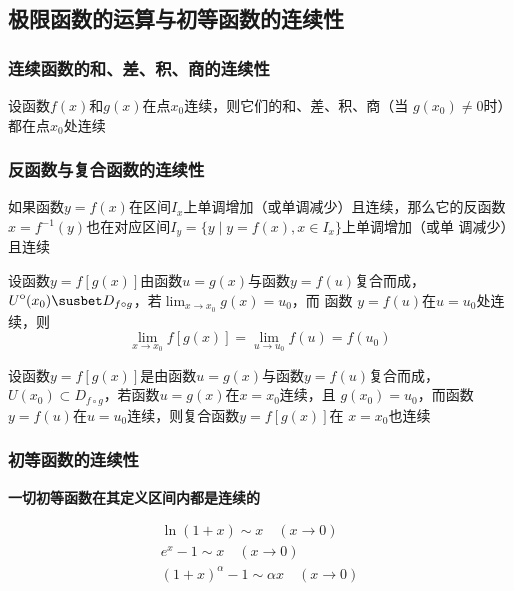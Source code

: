 \documentclass[11pt]{article}
\begin{document}
\subsection{极限函数的运算与初等函数的连续性}
\label{sec:orgcdb8aaa}
\subsubsection{连续函数的和、差、积、商的连续性}
\label{sec:orgd27b1d1}
\begin{theorem}[]
设函数\(f(x)\)和\(g(x)\)在点\(x_0\)连续，则它们的和、差、积、商（当
\(g(x_0)\neq0\)时）都在点\(x_0\)处连续
\end{theorem}
\subsubsection{反函数与复合函数的连续性}
\label{sec:org787c767}
\begin{theorem}[]
如果函数\(y=f(x)\)在区间\(I_x\)上单调增加（或单调减少）且连续，那么它的反函数
\(x=f^{-1}(y)\)也在对应区间\(I_y=\{y\mid y=f(x),x\in I_x\}\)上单调增加（或单
调减少）且连续
\end{theorem}

\begin{theorem}[]
设函数\(y=f[g(x)]\)由函数\(u=g(x)\)与函数\(y=f(u)\)复合而成，
\(\interior{U}(x_0)\susbet D_{f\circ g}\)，若\(\lim_{x\to x_0}g(x)=u_0\)，而
函数 \(y=f(u)\)在\(u=u_0\)处连续，则
\begin{equation*}
\lim_{x\to x_0}f[g(x)]=\lim_{u\to u_0}f(u)=f(u_0)
\end{equation*}
\end{theorem}

\begin{theorem}[]
设函数\(y=f[g(x)]\)是由函数\(u=g(x)\)与函数\(y=f(u)\)复合而成，
\(U(x_0)\subset D_{f\circ g}\)，若函数\(u=g(x)\)在\(x=x_0\)连续，且
\(g(x_0)=u_0\)，而函数\(y=f(u)\)在\(u=u_0\)连续，则复合函数\(y=f[g(x)]\)在
\(x=x_0\)也连续
\end{theorem}
\subsubsection{初等函数的连续性}
\label{sec:org46e89de}
\textbf{一切初等函数在其定义区间内都是连续的}

\begin{gather*}
\ln(1+x)\sim x\quad(x\to0)\\
e^x-1\sim x\quad(x\to0)\\
(1+x)^\alpha-1\sim\alpha x\quad(x\to0)
\end{gather*}
\end{document}
